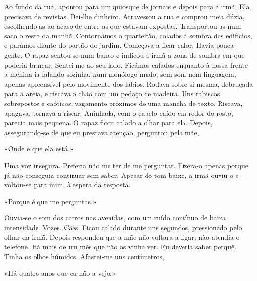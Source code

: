 Ao fundo da rua, apontou para um quiosque de jornais e depois para a
irmã. Ela precisava de revistas. Dei­‑lhe dinheiro. Atravessou a rua e
comprou meia dúzia, escolhendo­‑as ao acaso de entre as que estavam
expostas. Transportou­‑as num saco o resto da manhã. Contornámos o
quarteirão, colados à sombra dos edifícios, e parámos diante do portão
do jardim. Começava a ficar calor. Havia pouca gente. O rapaz sentou­‑se
num banco e indicou à irmã a zona de sombra em que poderia brincar.
Sentei­‑me ao seu lado. Ficámos calados enquanto à nossa frente a menina
ia falando sozinha, num monólogo mudo, sem som nem linguagem, apenas
apreensível pelo movimento dos lábios. Rodava sobre si mesma, debruçada
para a areia, e riscava o chão com um pedaço de madeira. Uns rabiscos
sobrepostos e caóticos, vagamente próximos de uma mancha de texto.
Riscava, apagava, tornava a riscar. Aninhada, com o cabelo caído em
redor do rosto, parecia mais pequena. O rapaz ficou calado a olhar para
ela. Depois, assegurando­‑se de que eu prestava atenção, perguntou pela
mãe,

«Onde é que ela está.»

Uma voz insegura. Preferia não me ter de me perguntar. Fizera­‑o apenas
porque já não conseguia continuar sem saber. Apesar do tom baixo, a irmã
ouviu­‑o e voltou­‑se para mim, à espera da resposta.

«Porque é que me perguntas.»

Ouvia­‑se o som dos carros nas avenidas, com um ruído contínuo de baixa
intensidade. Vozes. Cães. Ficou calado durante uns segundos, pressionado
pelo olhar da irmã. Depois respondeu que a mãe não voltara a ligar, não
atendia o telefone. Há mais de um mês que não os vinha ver. Eu deveria
saber porquê. Tinha os olhos húmidos. Afastei­‑me uns centímetros,

«Há quatro anos que eu não a vejo.»

